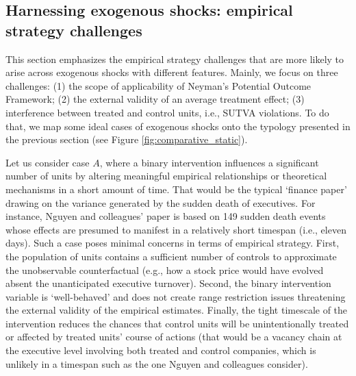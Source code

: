 \begin{refsection}
\section{Harnessing exogenous shocks: empirical strategy challenges}
\label{sec:harnessing_exogenous_shocks}

\noindent This section emphasizes the empirical strategy challenges that are more 
likely to arise across exogenous shocks with different features. Mainly,
we focus on three challenges: (1) the scope of applicability of Neyman's
Potential Outcome Framework; (2) the external validity of an average treatment 
effect; (3) interference between treated and control units, i.e., SUTVA 
violations. To do that, we map some ideal cases of exogenous shocks onto the typology presented in
the previous section (see Figure \ref{fig:comparative_static}).

Let us consider case $A$, where a binary intervention influences a significant
number of units by altering meaningful empirical relationships or theoretical
mechanisms in a short amount of time. That would be the typical `finance paper'
drawing on the variance generated by the sudden death of executives. For
instance, Nguyen and colleagues' \autocite*{nguyen_et_al_2014} paper is based on 149
sudden death events whose effects are presumed to manifest in a relatively short
timespan (i.e., eleven days). Such a case poses minimal concerns in terms of
empirical strategy.  First, the population of units contains a sufficient number of
controls to approximate the unobservable counterfactual (e.g., how a stock price
would have evolved absent the unanticipated executive turnover). Second, the
binary intervention variable is `well-behaved' and does not create range
restriction issues threatening the external validity of the empirical estimates.
Finally, the tight timescale of the intervention reduces the chances that
control units will be unintentionally treated or affected by treated units'
course of actions (that would be a vacancy chain at the executive
level involving both treated and control companies, which is unlikely in a
timespan such as the one Nguyen and colleagues \autocite*{nguyen_et_al_2014}
consider). 


\end{refsection}
